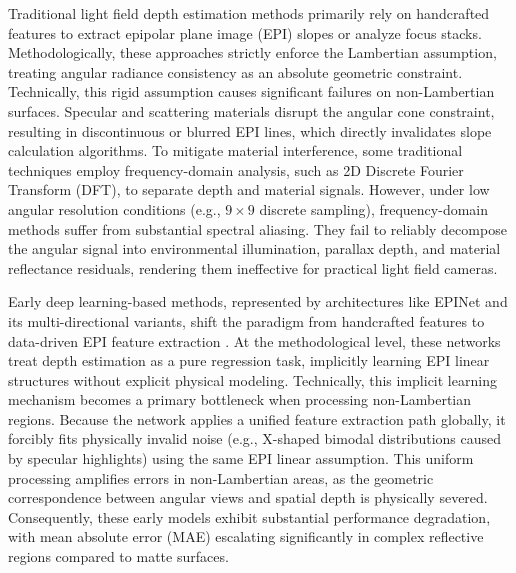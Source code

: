 \documentclass[lettersize,journal]{IEEEtran}
\begin{document}
Traditional light field depth estimation methods primarily rely on handcrafted features to extract epipolar plane image (EPI) slopes or analyze focus stacks. Methodologically, these approaches strictly enforce the Lambertian assumption, treating angular radiance consistency as an absolute geometric constraint. Technically, this rigid assumption causes significant failures on non-Lambertian surfaces. Specular and scattering materials disrupt the angular cone constraint, resulting in discontinuous or blurred EPI lines, which directly invalidates slope calculation algorithms. To mitigate material interference, some traditional techniques employ frequency-domain analysis, such as 2D Discrete Fourier Transform (DFT), to separate depth and material signals. However, under low angular resolution conditions (e.g., $9 \times 9$ discrete sampling), frequency-domain methods suffer from substantial spectral aliasing. They fail to reliably decompose the angular signal into environmental illumination, parallax depth, and material reflectance residuals, rendering them ineffective for practical light field cameras.

Early deep learning-based methods, represented by architectures like EPINet and its multi-directional variants, shift the paradigm from handcrafted features to data-driven EPI feature extraction \cite{vaswani2017}. At the methodological level, these networks treat depth estimation as a pure regression task, implicitly learning EPI linear structures without explicit physical modeling. Technically, this implicit learning mechanism becomes a primary bottleneck when processing non-Lambertian regions. Because the network applies a unified feature extraction path globally, it forcibly fits physically invalid noise (e.g., X-shaped bimodal distributions caused by specular highlights) using the same EPI linear assumption. This uniform processing amplifies errors in non-Lambertian areas, as the geometric correspondence between angular views and spatial depth is physically severed. Consequently, these early models exhibit substantial performance degradation, with mean absolute error (MAE) escalating significantly in complex reflective regions compared to matte surfaces.
\end{document}
